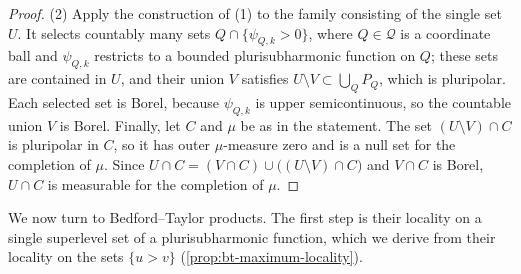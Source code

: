 \begin{proof}
(2) Apply the construction of (1) to the family consisting of the single set $U$. It selects countably many sets $Q\cap\{\psi_{Q,k}>0\}$, where $Q\in\mathcal Q$ is a coordinate ball and $\psi_{Q,k}$ restricts to a bounded plurisubharmonic function on $Q$; these sets are contained in $U$, and their union $V$ satisfies $U\setminus V\subset\bigcup_QP_Q$, which is pluripolar. Each selected set is Borel, because $\psi_{Q,k}$ is upper semicontinuous, so the countable union $V$ is Borel. Finally, let $C$ and $\mu$ be as in the statement. The set $(U\setminus V)\cap C$ is pluripolar in $C$, so it has outer $\mu$-measure zero and is a null set for the completion of $\mu$. Since $U\cap C=(V\cap C)\cup\bigl((U\setminus V)\cap C\bigr)$ and $V\cap C$ is Borel, $U\cap C$ is measurable for the completion of $\mu$.
\end{proof}

We now turn to Bedford--Taylor products. The first step is their locality on a single superlevel set of a plurisubharmonic function, which we derive from their locality on the sets $\{u>v\}$ (\cref{prop:bt-maximum-locality}).

